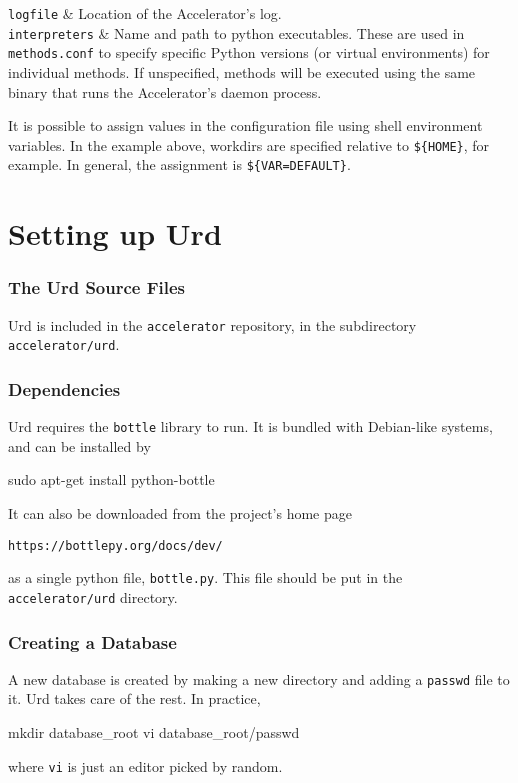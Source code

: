 \RPtwo \texttt{logfile} & Location of the Accelerator's log.\\[1ex]

\RPtwo \texttt{interpreters} & Name and path to python executables.
These are used in \texttt{methods.conf} to specify specific Python
versions (or virtual environments) for individual methods.  If
unspecified, methods will be executed using the same binary that runs
the Accelerator's daemon process.\\[1ex]

\stoptabletwo

It is possible to assign values in the configuration file using shell
environment variables.  In the example above, workdirs are specified
relative to \texttt{\$\{HOME\}}, for example.  In general, the
assignment is \texttt{\$\{VAR=DEFAULT\}}.



\clearpage

\section{Setting up Urd}
\label{sec:urd_setup}

\subsubsection{The Urd Source Files}

Urd is included in the \texttt{accelerator} repository, in the
subdirectory \texttt{accelerator/urd}.


\subsubsection{Dependencies}
Urd requires the \texttt{bottle} library to run.  It is bundled with
Debian-like systems, and can be installed by
\begin{shell}
sudo apt-get install python-bottle
\end{shell}
It can also be downloaded from the project's home page
\begin{verbatim}
https://bottlepy.org/docs/dev/
\end{verbatim}
as a single python file, \texttt{bottle.py}.  This file should be put
in the \texttt{accelerator/urd} directory.



\subsubsection{Creating a Database}
A new database is created by making a new directory and adding
a \texttt{passwd} file to it.  Urd takes care of the rest.  In
practice,
\begin{shell}
mkdir database_root
vi database_root/passwd
\end{shell}
where \texttt{vi} is just an editor picked by random.


